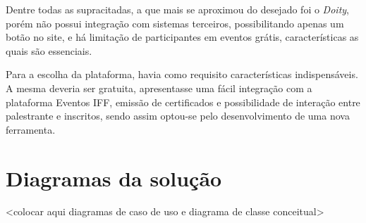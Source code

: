 Dentre todas as supracitadas, a que mais se aproximou do desejado foi o \textit{Doity}, porém não possui integração com sistemas terceiros, possibilitando apenas um botão no site, e há limitação de participantes em eventos grátis, características as quais são essenciais.

Para a escolha da plataforma, havia como requisito características indispensáveis. A mesma deveria ser gratuita, apresentasse uma fácil integração com a plataforma Eventos IFF, emissão de certificados e possibilidade de interação entre palestrante e inscritos, sendo assim optou-se pelo desenvolvimento de uma nova ferramenta.

\section{Diagramas da solução}

<colocar aqui diagramas de caso de uso e diagrama de classe conceitual>